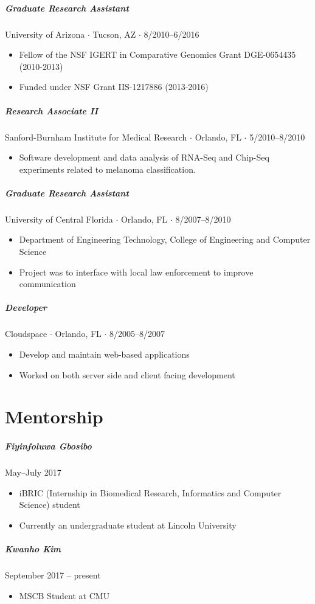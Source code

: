 \documentclass[10pt,letterpaper]{article}
\begin{document}
\subparagraph{Graduate Research Assistant}
University of Arizona $\cdot$ Tucson, AZ $\cdot$ 8/2010--6/2016 
\begin{itemize}
    \item Fellow of the NSF IGERT in Comparative Genomics Grant DGE-0654435 (2010-2013)
    \item Funded under NSF Grant IIS-1217886 (2013-2016)
\end{itemize}

\subparagraph{Research Associate II}
Sanford-Burnham Institute for Medical Research $\cdot$ Orlando, FL $\cdot$ 5/2010--8/2010 
\begin{itemize}
    \item Software development and data analysis of RNA-Seq and Chip-Seq experiments related to melanoma classification.
\end{itemize}

\subparagraph{Graduate Research Assistant}
University of Central Florida $\cdot$ Orlando, FL $\cdot$ 8/2007--8/2010 
\begin{itemize}
    \item Department of Engineering Technology, College of Engineering and Computer Science
    \item Project was to interface with local law enforcement to improve communication
\end{itemize}

\subparagraph{Developer}
Cloudspace $\cdot$ Orlando, FL $\cdot$ 8/2005--8/2007 
\begin{itemize}
    \item Develop and maintain web-based applications 
    \item Worked on both server side and client facing development
\end{itemize}

\section*{Mentorship}
\subparagraph{Fiyinfoluwa Gbosibo} May--July 2017
\begin{itemize}
\item iBRIC (Internship in Biomedical Research, Informatics and Computer Science) student
\item Currently an undergraduate student at Lincoln University
\end{itemize}

\subparagraph{Kwanho Kim} September 2017 -- present
\begin{itemize}
\item MSCB Student at CMU
\end{itemize}
\end{document}
